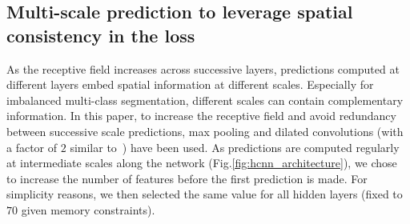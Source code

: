\documentclass[runningheads,orivec,a4paper]{llncs}
\begin{document}
\subsection{Multi-scale prediction to leverage spatial consistency in the loss}
%
%
%
%
%
As the receptive field 
increases across successive layers, predictions computed
at different layers embed spatial information at different scales. 
Especially for imbalanced multi-class segmentation,
different scales can contain complementary information. 
%
In this paper, to increase the receptive field and avoid redundancy between
successive scale predictions, max pooling and
dilated convolutions (with a factor of $2$ similar to~\cite{highresnet})
have been used. 
%
As predictions are computed
regularly at intermediate scales along the network (Fig.\ref{fig:hcnn_architecture}), we chose to increase the number of features before the first prediction is made. For simplicity reasons, we then selected
the same value for all hidden layers (fixed to $70$ given memory
constraints). 
\end{document}
